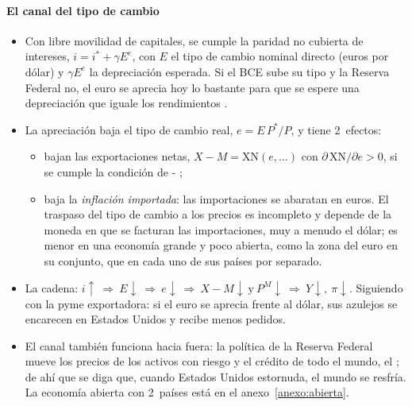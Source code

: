 \documentclass[11pt]{article}
\begin{document}
\paragraph{El canal del tipo de cambio}
\begin{itemize}
\item Con libre movilidad de capitales, se cumple la paridad no cubierta de intereses, $i=i^*+\gamma E^e$, con $E$ el tipo de cambio nominal directo (euros por dólar) y $\gamma E^e$ la depreciación esperada. Si el BCE sube su tipo y la Reserva Federal no, el euro se aprecia hoy lo bastante para que se espere una depreciación que iguale los rendimientos .
\item La apreciación baja el tipo de cambio real, $e=E\,P^*/P$, y tiene 2~efectos:
  \begin{itemize}
  \item bajan las exportaciones netas, $X-M=\mathrm{XN}(e,\ldots)$ con $\partial\,\mathrm{XN}/\partial e>0$, si se cumple la condición de - ;
  \item baja la \emph{inflación importada}: las importaciones se abaratan en euros. El traspaso del tipo de cambio a los precios es incompleto y depende de la moneda en que se facturan las importaciones, muy a menudo el dólar\nocite{Gopinath2020DCP}; es menor en una economía grande y poco abierta, como la zona del euro en su conjunto, que en cada uno de sus países por separado.
  \end{itemize}
\item La cadena: $i\uparrow\ \Rightarrow\ E\downarrow\ \Rightarrow\ e\downarrow\ \Rightarrow\ X-M\downarrow\ \text{y}\ P^M\downarrow\ \Rightarrow\ Y\downarrow,\ \pi\downarrow$. Siguiendo con la pyme exportadora: si el euro se aprecia frente al dólar, sus azulejos se encarecen en Estados Unidos y recibe menos pedidos.
\item El canal también funciona hacia fuera: la política de la Reserva Federal mueve los precios de los activos con riesgo y el crédito de todo el mundo, el \nocite{Rey2013Dilema,MirandaAgrippinoRey2020}; de ahí que se diga que, cuando Estados Unidos estornuda, el mundo se resfría. La economía abierta con 2~países está en el anexo~\ref{anexo:abierta}.
\end{itemize}
\end{document}
